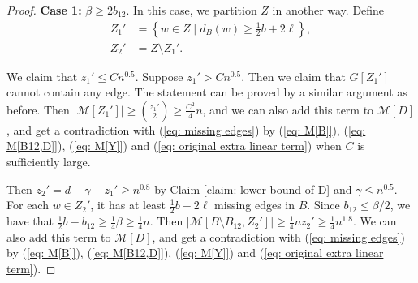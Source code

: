\documentclass[10pt,a4paper]{amsart}
\begin{document}
\begin{proof}
	\textbf{Case 1:} $\beta \ge 2b_{12}$.
	In this case, we partition $Z$ in another way.
	Define
	\begin{equation*}
	\begin{aligned}
		Z_1' &= \left\{w \in Z \mid d_{B}(w) \ge \frac{1}{2}b + 2\ell \right\},\\
		Z_2' &= Z\setminus Z_1'.
	\end{aligned}
	\end{equation*}

	We claim that $z_1' \le Cn^{0.5}$.
	Suppose $z_1' > Cn^{0.5}$. Then we claim that $G[Z_1']$ cannot contain any edge.
	The statement can be proved by a similar argument as before.
	Then $|\mathcal{M}[Z_1']| \ge \binom{z_1'}{2} \ge \frac{C^2}{4}n$, and we can also add this term to $\mathcal{M}[D]$, and get a contradiction   with (\ref{eq: missing edges}) by (\ref{eq: M[B]}), (\ref{eq: M[B12,D]}), (\ref{eq: M[Y]}) and (\ref{eq: original extra linear term}) when $C$ is sufficiently large.
	
	Then  $z_2' = d - \gamma - z_1' \ge n^{0.8}$ by Claim \ref{claim: lower bound of D} and $\gamma \le n^{0.5}$.
	For each $w \in Z_2'$, it has at least $\frac{1}{2}b - 2\ell$ missing edges in $B$.
	Since $b_{12} \le \beta/2$, we have that $\frac{1}{2} b - b_{12} \ge \frac{1}{4}\beta \ge \frac{1}{4}n$.
	Then $|\mathcal{M}[B\setminus B_{12}, Z_2']| \ge \frac{1}{4}n z_2' \ge \frac{1}{4}n^{1.8}$.
	We can also add this term to $\mathcal{M}[D]$, and get a contradiction   with (\ref{eq: missing edges}) by (\ref{eq: M[B]}), (\ref{eq: M[B12,D]}), (\ref{eq: M[Y]}) and (\ref{eq: original extra linear term}).



\end{proof}
\end{document}
